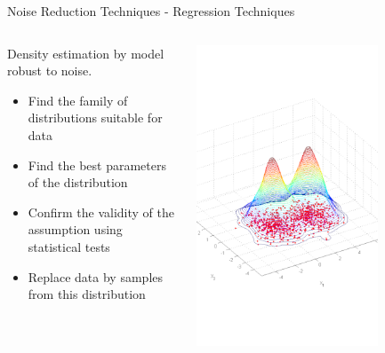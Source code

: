 \begin{frame}{Noise Reduction Techniques - Regression Techniques}
    \begin{columns}
    \begin{column}{0.5\textwidth}
        Density estimation by model robust to noise.
       \begin{itemize}
        \item Find the family of distributions suitable for data
        \item Find the best parameters of the distribution
        \item Confirm the validity of the assumption using statistical tests
        \item Replace data by samples from this distribution
    \end{itemize}
    \end{column}
    \begin{column}{0.5\textwidth}
        \begin{center}
        \includegraphics[width=0.7\textwidth]{assets/noise_regression.png}
        \end{center}
    \end{column}
    \end{columns}
\end{frame}

